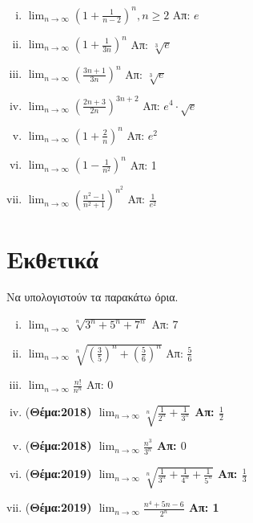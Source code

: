 \begin{enumerate}
        \begin{enumerate}[i)]
            \item $ \lim_{n \to \infty} \left(1+ \frac{1}{n-2}\right)^{n}, 
                n \geq 2 $ 
                \hfill Απ: $e$  
            \item $ \lim_{n \to \infty} \left(1 + \frac{1}{3n}\right)^{n} $ 
                \hfill Απ: $ \sqrt[3]{e} $ 
            \item $ \lim_{n \to \infty} (\frac{3n+1}{3n} )^{n} $ 
                \hfill Απ: $ \sqrt[3]{e}$ 
            \item $ \lim_{n \to \infty} \left(\frac{2n +3}{2n} 
                \right)^{3n+2}  $
                \hfill Απ: $ e^{4}\cdot \sqrt{e} $ 
            \item $ \lim_{n \to \infty} \left(1+ \frac{2}{n}\right)^{n} $ 
                \hfill Απ: $ e^{2} $ 
            \item $ \lim_{n \to \infty}\left(1-\frac{1}{n^{2}} \right)^{n} $ 
                \hfill Απ: 1 
            \item $ \lim_{n \to \infty} \left(\frac{n^{2}-1}{n^{2}+1} 
                \right)^{n^{2}} $
                \hfill Απ: $ \frac{1}{e^{2}} $ 
        \end{enumerate}

\end{enumerate}



\section{Εκθετικά}

Να υπολογιστούν τα παρακάτω όρια.

\begin{enumerate}[i)]
    \item $ \lim_{n \to \infty} \sqrt[n]{3^{n}+5^{n}+7^{n}}  $ \hfill Απ: 7 
    \item $ \lim_{n \to \infty} \sqrt[n]{\left(\frac{3}{5} \right)^{n} + 
        \left(\frac{5}{6} \right)^{n}} $ \hfill Απ: $ \frac{5}{6} $ 
    \item $ \lim_{n \to \infty} \frac{n!}{n^{n}} $ \hfill Απ: 0  
    \item (\bfseries Θέμα:2018) $ \lim_{n \to \infty} \sqrt[n]{\frac{1}{2^{n}}+ 
        \frac{1}{3^{n}}} $ \hfill Απ: $ \frac{1}{2} $ 
    \item (\bfseries Θέμα:2018) $ \lim_{n \to \infty} \frac{n^{3}}{3^{n}} $ 
        \hfill Απ: $ 0 $
    \item (\bfseries Θέμα:2019) $ \lim_{n \to \infty} \sqrt[n]{\frac{1}{3^{n}} + 
            \frac{1}{4^{n}} + \frac{1}{5^{n}}} $ \hfill Απ: $ \frac{1}{3} $
    \item (\bfseries Θέμα:2019) $ \lim_{n \to \infty} \frac{n^{4}+5n-6}{2^{n}} $ 
        \hfill Απ: 1 
\end{enumerate}


